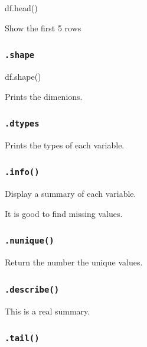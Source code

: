 \documentclass[]{book}
\newenvironment{Shaded}{\begin{snugshade}}{\end{snugshade}}
\newcommand{\NormalTok}[1]{#1}
\begin{document}
\begin{Shaded}
\begin{Highlighting}[]
\NormalTok{df.head()}
\end{Highlighting}
\end{Shaded}

Show the first 5 rows

\subsubsection{\texorpdfstring{\texttt{.shape}}{.shape}}\label{shape}

\begin{Shaded}
\begin{Highlighting}[]
\NormalTok{df.shape()}
\end{Highlighting}
\end{Shaded}

Prints the dimenions.

\subsubsection{\texorpdfstring{\texttt{.dtypes}}{.dtypes}}\label{dtypes}

Prints the types of each variable.

\subsubsection{\texorpdfstring{\texttt{.info()}}{.info()}}\label{info}

Display a summary of each variable.

It is good to find missing values.

\subsubsection{\texorpdfstring{\texttt{.nunique()}}{.nunique()}}\label{nunique}

Return the number the unique values.

\subsubsection{\texorpdfstring{\texttt{.describe()}}{.describe()}}\label{describe}

This is a real summary.

\subsubsection{\texorpdfstring{\texttt{.tail()}}{.tail()}}\label{tail}
\end{document}
